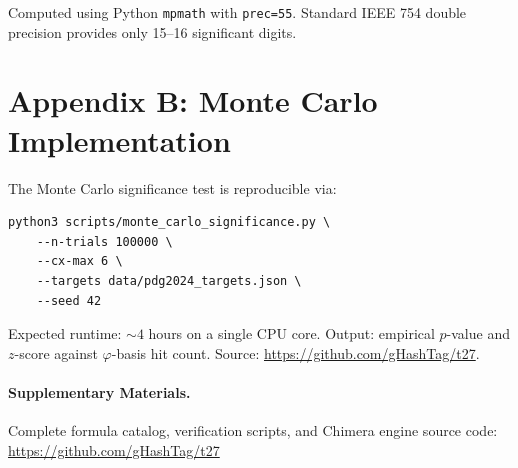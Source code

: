 \documentclass[10pt,a4paper]{article}
\begin{document}
Computed using Python \texttt{mpmath} with \texttt{prec=55}. Standard IEEE 754 double precision
provides only 15--16 significant digits.

\section*{Appendix B: Monte Carlo Implementation}

The Monte Carlo significance test is reproducible via:
\begin{verbatim}
python3 scripts/monte_carlo_significance.py \
    --n-trials 100000 \
    --cx-max 6 \
    --targets data/pdg2024_targets.json \
    --seed 42
\end{verbatim}

Expected runtime: $\sim 4$ hours on a single CPU core. Output: empirical $p$-value and
$z$-score against $\varphi$-basis hit count. Source: \url{https://github.com/gHashTag/t27}.

\paragraph{Supplementary Materials.}
Complete formula catalog, verification scripts, and Chimera engine source code:
\url{https://github.com/gHashTag/t27}
\end{document}
